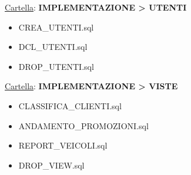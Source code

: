 \documentclass[12pt]{report}
\begin{document}
\underline{Cartella}: \textbf{IMPLEMENTAZIONE > UTENTI}
\begin{itemize}
\item CREA\_UTENTI.sql
\item DCL\_UTENTI.sql
\item DROP\_UTENTI.sql
\end{itemize}
\underline{Cartella}: \textbf{IMPLEMENTAZIONE > VISTE}
\begin{itemize}
\item CLASSIFICA\_CLIENTI.sql
\item ANDAMENTO\_PROMOZIONI.sql
\item REPORT\_VEICOLI.sql
\item DROP\_VIEW.sql
\end{itemize}
\end{document}
